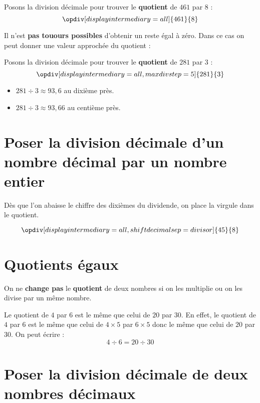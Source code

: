 \documentclass[a4paper,dvipsnames]{article}
\begin{document}
\begin{Ex}
Posons la division décimale pour trouver le \textbf{quotient} de $461$ par $8$ :
\[\opdiv[displayintermediary=all]{461}{8}\]
\end{Ex}

\begin{Rq}
Il n'est \textbf{pas touours possibles} d'obtenir un reste égal à zéro. Dans ce cas on peut donner une valeur approchée du quotient :
\begin{Ex}
Posons la division décimale pour trouver le \textbf{quotient} de $281$ par $3$ :
\[\opdiv[displayintermediary=all,maxdivstep=5]{281}{3}\]
\begin{itemize}
\item $281 \div 3\approx93,6$ au dixième près.
\item $281 \div 3\approx93,66$ au centième près.
\end{itemize}
\end{Ex}
\end{Rq}



\section{Poser la division décimale d'un nombre décimal par un nombre entier}

\begin{Mt}
Dès que l’on abaisse le chiffre des dixièmes du dividende, on place la virgule dans le quotient.

\[\opdiv[displayintermediary=all,shiftdecimalsep=divisor]{45}{8}\]
\end{Mt}

\section{Quotients égaux}

\begin{Pp}
On ne \textbf{change pas} le \textbf{quotient} de deux nombres si on les multiplie ou on les divise par un même nombre.
\end{Pp}

\begin{Ex}
Le quotient de $4$ par $6$ est le même que celui de $20$ par $30$.
En effet, le quotient de $4$ par $6$ est le même que celui de $4\times5$ par $6\times5$ donc le même que celui de $20$ par $30$. On peut écrire :
\[4\div6=20\div30\]
\end{Ex}

\section{Poser la division décimale de deux nombres décimaux}
\end{document}
